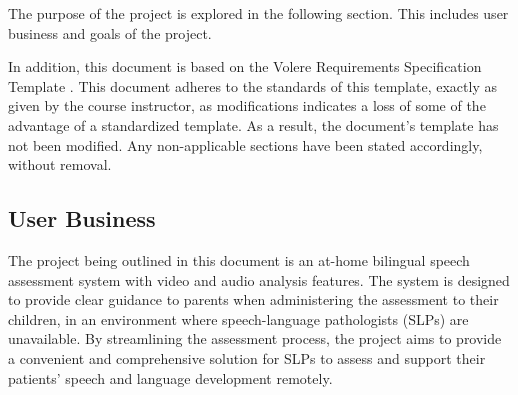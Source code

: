 \documentclass[12pt]{article}
\begin{document}
\noindent\hspace{2em}The purpose of the project is explored in the following section. This includes
user business and goals of the project.

\noindent\hspace{2em}In addition, this document is based on the Volere Requirements Specification Template \cite{volere}. This document adheres to the standards of this template,
exactly as given by the course instructor, as modifications indicates a loss of some of the advantage of a standardized template. As a result, the document's
template has not been modified. Any non-applicable sections have been stated accordingly, without removal.

\subsection{User Business}
\hspace{2em}The project being outlined in this document is an at-home bilingual speech 
assessment system with video and audio analysis features. The system is designed 
to provide clear guidance to parents when administering the assessment to their 
children, in an environment where speech-language pathologists (SLPs) are 
unavailable. By streamlining the assessment process, the project aims to provide a 
convenient and comprehensive solution for SLPs to assess and support their patients'
speech and language development remotely. 
\end{document}
